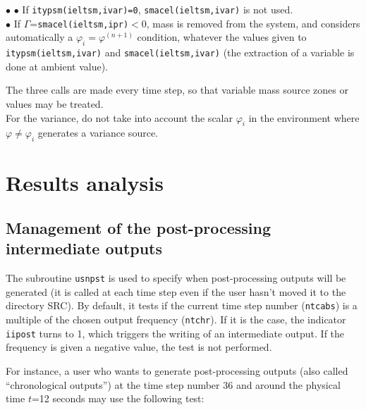 {{{\begin{list}{$\bullet$}{}
$\bullet$ If \texttt{itypsm(ieltsm,ivar)=0}, \texttt{smacel(ieltsm,ivar)}
      is not used.\\
$\bullet$ If $\Gamma$=\texttt{smacel(ieltsm,ipr)}$<$0, mass is removed from
      the system, and \CS considers automatically a
      $\varphi_i=\varphi^{(n+1)}$ condition, whatever the values given
      to \texttt{itypsm(ieltsm,ivar)} and \texttt{smacel(ieltsm,ivar)}
      (the extraction of a variable is done at ambient value).
\end{list}



The three calls are made every time step, so that variable mass source
zones or values may be treated.\\

For the variance, do not take into account the scalar $\varphi_i$ in the environment
where $\varphi\ne\varphi_i$ generates a variance source.

\section{Results analysis}

\subsection{Management of the post-processing intermediate outputs}

The subroutine \texttt{usnpst} is used to specify when post-processing outputs will be
generated (it is called at each time step even if the user hasn't moved it to the directory SRC). By default, it tests if the current time step number (\texttt{ntcabs}) is a
multiple of the chosen output frequency (\texttt{ntchr}). If it is the case, the
indicator \texttt{iipost} turns to 1, which triggers the writing of an
intermediate output. If the frequency is given a negative value, the
test is not performed.

For instance, a user who wants to generate post-processing outputs (also
called ``chronological outputs'') at
the time step number 36 and around the physical time $t$=12 seconds may
use the following test:\\

}}}
